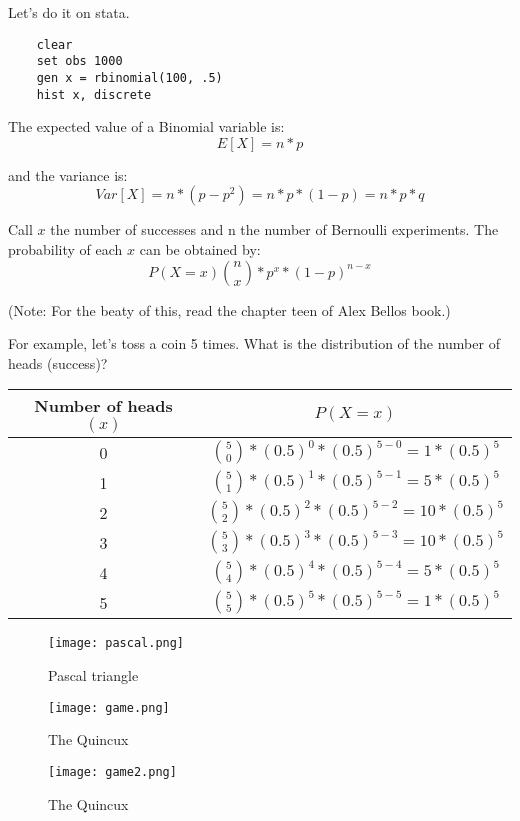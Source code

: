 \documentclass[11pt]{article}
\begin{document}
	Let's do it on stata.\\

	\begin{verbatim}
	clear
	set obs 1000
	gen x = rbinomial(100, .5)
	hist x, discrete
	\end{verbatim}

	The expected value of a Binomial variable is:
		\[E[X] = n*p\]
		
	and the variance is:
		\[Var[X]=n*(p-p^2)= n*p*(1-p) = n*p*q\]

	Call $x$ the number of successes and n the number of Bernoulli experiments. The probability of each $x$ can be obtained by:
		\[P(X=x)\binom{n}{x} * p^x * (1-p)^{n-x}\]
		
		(Note: For the beaty of this, read the chapter teen of Alex Bellos book.)	

	For example, let's toss a coin 5 times. What is the distribution of the number of heads (success)?\newline\\
		\begin{tabular}{|c|c|}
\hline
	Number of heads $(x)$ & $P(X=x)$\\
\hline
0 & $\binom{5}{0} * (0.5)^0 * (0.5)^{5-0} = 1 * (0.5)^5$\\
1 & $\binom{5}{1} * (0.5)^1 * (0.5)^{5-1} = 5 * (0.5)^5$\\
2 & $\binom{5}{2} * (0.5)^2 * (0.5)^{5-2} = 10 * (0.5)^5$\\
3 & $\binom{5}{3} * (0.5)^3 * (0.5)^{5-3} = 10 * (0.5)^5$\\
4 & $\binom{5}{4} * (0.5)^4 * (0.5)^{5-4} = 5 * (0.5)^5$\\
5 & $\binom{5}{5} * (0.5)^5 * (0.5)^{5-5} = 1 * (0.5)^5$\\
\hline
\end{tabular}


\begin{figure}[htp]
\centering
\texttt{[image: pascal.png]}
\caption{Pascal triangle}
\label{}
\end{figure}

\begin{figure}[htp]
\centering
\texttt{[image: game.png]}
\caption{The Quincux}
\label{}
\end{figure}

\begin{figure}[htp]
\centering
\texttt{[image: game2.png]}
\caption{The Quincux}
\label{}
\end{figure}
\end{document}
